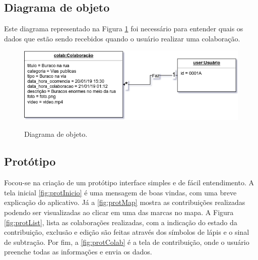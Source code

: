     
    \subsection{Diagrama de objeto}
    Este diagrama representado na Figura \ref{fig:diagObj} foi necessário para entender quais os dados que estão sendo recebidos quando o usuário realizar uma colaboração.
    \begin{figure}[H]
    	\centering
    	\caption{Diagrama de objeto.}	
    	\includegraphics[width=\linewidth]{Imagens/diagObj.png}
    	\label{fig:diagObj}
    \end{figure}
    
    
    \subsection{Protótipo}
    Focou-se na criação de um protótipo interface simples e de fácil entendimento. A tela inicial \ref{fig:protInicio} é uma mensagem de boas vindas, com uma breve explicação do aplicativo. Já a \ref{fig:protMap} mostra as contribuições realizadas podendo ser visualizadas ao clicar em uma das marcas no mapa. A Figura \ref{fig:protList}, lista as colaborações realizadas, com a indicação do estado da contribuição, exclusão e edição são feitas através dos símbolos de lápis e o sinal de subtração. Por fim, a \ref{fig:protColab} é a tela de contribuição, onde o usuário preenche todas as informações e envia os dados.
    
